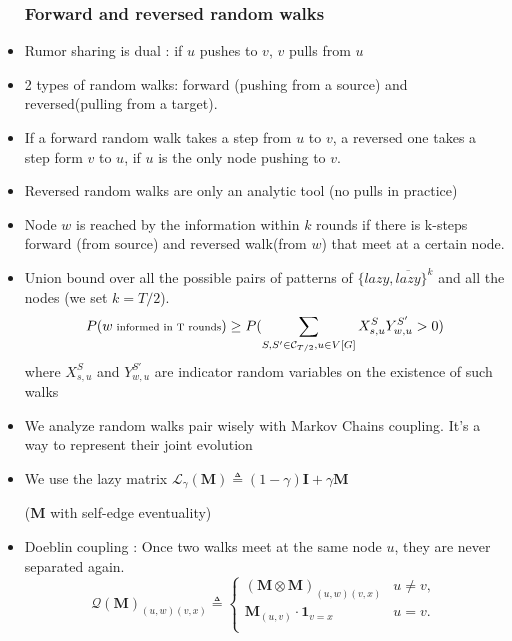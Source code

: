 \documentclass{beamer}
\begin{document}
\begin{frame}
\begin{itemize}
\frametitle{Forward and reversed random walks}
\item Rumor sharing is dual : if $u$ pushes to $v$, $v$ pulls from $u$
\item 2 types of random walks: forward (pushing from a source) and reversed(pulling from a target). 
\item If a forward random walk takes a step from $u$ to $v$, a reversed one   takes a step form $v$ to $u$, if $u$ is the only node pushing to $v$.
\item Reversed random walks are only an analytic tool (no pulls in practice)
 
\end{itemize}

\end{frame}


\begin{frame}
\begin{itemize}
\frametitle{Probabilistic computations}
\item Node $w$ is reached by the information within $k$ rounds if there is k-steps forward (from source) and reversed walk(from $w$) that meet at a certain node.
\item  Union bound over all the possible pairs of patterns of $\{ lazy,\overline{lazy} \}^k$ and all the nodes (we set $k=T/2$).
\begin{align*}
  \scriptsize
  P(w \text{ informed in T rounds}) \geq P(\sum_{S,S'\in \mathcal C_{T/2}, u\in V[G]} X_{s,u}^S Y_{w,u}^{S'} > 0)
\end{align*}
 where $X_{s,u}^S$ and $Y_{w,u}^{S'}$ are indicator random variables on the existence of such walks

\end{itemize}


\end{frame}

\begin{frame}
\begin{itemize}
\frametitle{Matrix coupling }
\item We analyze random walks pair wisely with Markov Chains coupling. It's a way to represent their joint evolution
\item We use the lazy matrix $
  \mathcal L _ \gamma (\mathbf{M}) \triangleq (1-\gamma) \mathbf{I} + \gamma \mathbf{M}
$

  (\textbf{M} with self-edge eventuality)
\item Doeblin coupling  : Once two walks meet at the same node $u$, they are never separated again.
\[
  \mathcal Q(\mathbf{M})_{(u,w)(v,x)} \triangleq \left\{
    \begin{array}{ll}
      (\mathbf{M} \otimes \mathbf{M})_{(u,w)(v,x)} & u \not = v,\\
      \mathbf{M}_{(u,v)} \cdot \mathbf{1}_{v = x} & u = v.\\
    \end{array}
  \right.
\]


\end{itemize}
\end{frame}
\end{document}
